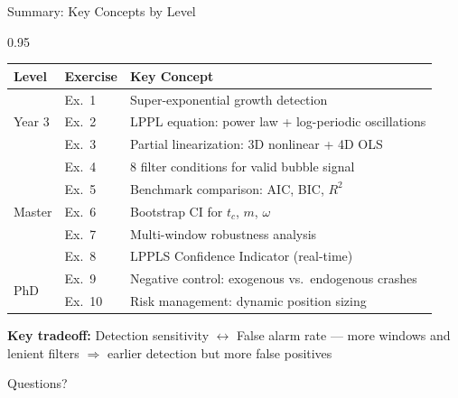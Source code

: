 \documentclass[9pt, aspectratio=169, t]{beamer}
\begin{document}
\begin{frame}{Summary: Key Concepts by Level}
    \begin{cminipage}{0.95\textwidth}
    {\footnotesize
    \begin{center}
    \begin{tabular}{lll}
        \toprule
        \textbf{Level} & \textbf{Exercise} & \textbf{Key Concept} \\
        \midrule
        \multirow{3}{*}{Year 3} & Ex.\ 1 & Super-exponential growth detection \\
        & Ex.\ 2 & LPPL equation: power law + log-periodic oscillations \\
        & Ex.\ 3 & Partial linearization: 3D nonlinear + 4D OLS \\
        \midrule
        \multirow{5}{*}{Master} & Ex.\ 4 & 8 filter conditions for valid bubble signal \\
        & Ex.\ 5 & Benchmark comparison: AIC, BIC, $R^2$ \\
        & Ex.\ 6 & Bootstrap CI for $t_c$, $m$, $\omega$ \\
        & Ex.\ 7 & Multi-window robustness analysis \\
        & Ex.\ 8 & LPPLS Confidence Indicator (real-time) \\
        \midrule
        \multirow{2}{*}{PhD} & Ex.\ 9 & Negative control: exogenous vs.\ endogenous crashes \\
        & Ex.\ 10 & Risk management: dynamic position sizing \\
        \bottomrule
    \end{tabular}
    \end{center}

    \vspace{3mm}

    {\small \textbf{Key tradeoff:} Detection sensitivity $\longleftrightarrow$ False alarm rate --- more windows and lenient filters $\Rightarrow$ earlier detection but more false positives}
    }

    \vspace{0.2cm}
    \begin{center}
        \Large\textcolor{MainBlue}{Questions?}
    \end{center}
    \end{cminipage}
\end{frame}

\end{document}
